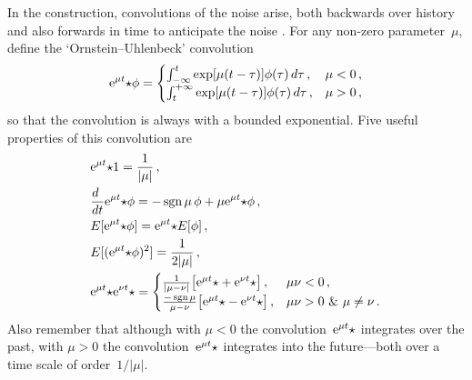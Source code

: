 \documentclass[11pt,a5paper]{article}
\newcommand{\Z}[1]{{\rm e}^{#1t}{\star}}
\newcommand{\sgn}{\operatorname{sgn}}
\begin{document}
In the construction, convolutions of the noise arise, both
backwards over history and also forwards in time to
anticipate the noise \cite[]{Roberts06k, Roberts2018a}. For
any non-zero parameter~$\mu$, define the
`Ornstein--Uhlenbeck' convolution
\begin{equation}
    \Z{\mu}\phi=
    \begin{cases}
        \int_{-\infty}^t \exp[\mu(t-\tau)]\phi(\tau)\,d\tau\,,
        &\mu<0\,, \\
        \int_t^{+\infty} \exp[\mu(t-\tau)]\phi(\tau)\,d\tau\,,
        &\mu>0\,,             
    \end{cases}
    \label{eq:zmuf}
\end{equation}
so that the convolution is always with a bounded
exponential. Five useful properties of this convolution are
\begin{align}&
    \Z\mu1=\frac1{|\mu|}\,,
    \label{eq:conv1}
    \\&
    \frac{d\ }{dt}\Z{\mu}\phi=-\sgn\mu\,\phi+\mu\Z{\mu}\phi\,,
    \label{eq:ddtconv}
    \\&
    E[\Z{\mu}\phi]=\Z{\mu}E[\phi]\,,
    \label{eq:exz}
    \\&
    E[(\Z{\mu}\phi)^2]=\frac1{2|\mu|}\,,
    \label{eq:exzz}
    \\&
    \Z\mu\Z\nu=\begin{cases}
    \frac1{|\mu-\nu|}\big[ \Z\mu+\Z\nu \big]\,, &\mu\nu<0\,, \\
    \frac{-\sgn\mu}{\mu-\nu}\big[ \Z\mu-\Z\nu \big]\,, 
    &\mu\nu>0\ \&\ \mu\neq\nu\,.
    \end{cases}
    \label{eq:twoconv}
\end{align}
Also remember that although with $\mu<0$ the
convolution~$\Z\mu$ integrates over the past, with $\mu>0$
the convolution~$\Z\mu$ integrates into the future---both
over a time scale of order~$1/|\mu|$.
\end{document}

